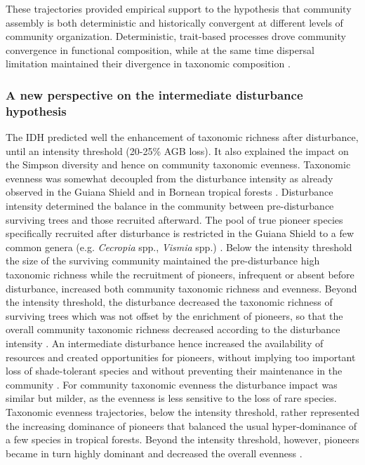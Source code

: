 \documentclass[
  11pt,
  french,
  A4paper,
  extrafontsizes,onecolumn,openright
  ]{memoir}
\begin{document}
These trajectories provided empirical support to the hypothesis that
community assembly is both deterministic and historically convergent at
different levels of community organization. Deterministic, trait-based
processes drove community convergence in functional composition, while
at the same time dispersal limitation maintained their divergence in
taxonomic composition \autocite{Fukami2005}.

\subsubsection{A new perspective on the intermediate disturbance
hypothesis}\label{a-new-perspective-on-the-intermediate-disturbance-hypothesis}

The IDH predicted well the enhancement of taxonomic richness after
disturbance, until an intensity threshold (20-25\% AGB loss). It also
explained the impact on the Simpson diversity and hence on community
taxonomic evenness. Taxonomic evenness was somewhat decoupled from the
disturbance intensity as already observed in the Guiana Shield
\autocite{Baraloto2012} and in Bornean tropical forests
\autocite{Cannon1998}. Disturbance intensity determined the balance in
the community between pre-disturbance surviving trees and those
recruited afterward. The pool of true pioneer species specifically
recruited after disturbance is restricted in the Guiana Shield to a few
common genera (e.g. \emph{Cecropia} spp., \emph{Vismia} spp.)
\autocite{Guitet2018}. Below the intensity threshold the size of the
surviving community maintained the pre-disturbance high taxonomic
richness while the recruitment of pioneers, infrequent or absent before
disturbance, increased both community taxonomic richness and evenness.
Beyond the intensity threshold, the disturbance decreased the taxonomic
richness of surviving trees which was not offset by the enrichment of
pioneers, so that the overall community taxonomic richness decreased
according to the disturbance intensity \autocite{Molino2001}. An
intermediate disturbance hence increased the availability of resources
and created opportunities for pioneers, without implying too important
loss of shade-tolerant species and without preventing their maintenance
in the community \autocite{Bongers2009}. For community taxonomic
evenness the disturbance impact was similar but milder, as the evenness
is less sensitive to the loss of rare species. Taxonomic evenness
trajectories, below the intensity threshold, rather represented the
increasing dominance of pioneers that balanced the usual hyper-dominance
of a few species in tropical forests. Beyond the intensity threshold,
however, pioneers became in turn highly dominant and decreased the
overall evenness \autocite{Baraloto2012}.
\end{document}
